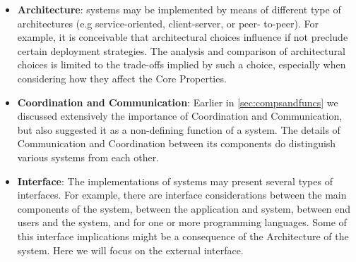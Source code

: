 \documentclass{sig-alternate}
\begin{document}
\begin{itemize}

\item \textbf{Architecture}: \pilot systems may be implemented by
  means of different type of architectures (e.g service-oriented,
  client-server, or peer- to-peer). For example, it is conceivable
  that architectural choices influence if not preclude certain
  deployment strategies. The analysis and comparison of architectural
  choices is limited to the trade-offs implied by such a choice,
  especially when considering how they affect the Core Properties.



\item \textbf{Coordination and Communication}: Earlier in
  \ref{sec:compsandfuncs} we discussed extensively the importance of
  Coordination and Communication, but also suggested it as a
  non-defining function of a \pilot system.  The details of
  Communication and Coordination between its components do distinguish
  various \pilot systems from each other.

\item \textbf{Interface}: The implementations of \pilot systems may present
  several types of interfaces. For example, there are interface considerations
  between the main components of the \pilot system, between the application and
  \pilot system, between end users and the \pilot system, and for one or more
  programming languages. Some of this interface implications might be a
  consequence of the Architecture of the \pilot system.
  Here we will focus on the external interface.


\end{itemize}
\end{document}
